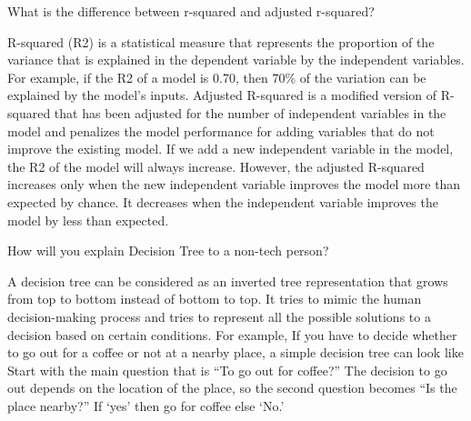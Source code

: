 	\begin{qanda}
		\begin{question}
 What is the difference between r-squared and adjusted r-squared?
		\end{question}
		\begin{answer}
R-squared (R2) is a statistical measure that represents the proportion of the variance that is explained in the dependent variable by the independent variables. For example, if the R2 of a model is 0.70, then 70\% of the variation can be explained by the model's inputs. Adjusted R-squared is a modified version of R-squared that has been adjusted for the number of independent variables in the model and penalizes the model performance for adding variables that do not improve the existing model. If we add a new independent variable in the model, the R2 of the model will always increase. However, the adjusted R-squared increases only when the new independent variable improves the model more than expected by chance. It decreases when the independent variable improves the model by less than expected.
		\end{answer}
	\end{qanda}

	\begin{qanda}
		\begin{question}
How will you explain Decision Tree to a non-tech person?
		\end{question}
		\begin{answer}
A decision tree can be considered as an inverted tree representation that grows from top to bottom instead of bottom to top. It tries to mimic the human decision-making process and tries to represent all the possible solutions to a decision based on certain conditions. For example, If you have to decide whether to go out for a coffee or not at a nearby place, a simple decision tree can look like Start with the main question that is ``To go out for coffee?'' The decision to go out depends on the location of the place, so the second question becomes ``Is the place nearby?'' If `yes' then go for coffee else `No.'
		\end{answer}
	\end{qanda}

